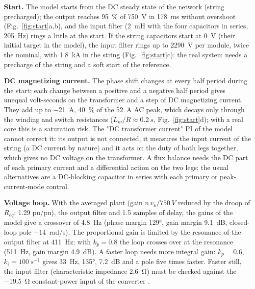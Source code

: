 \documentclass[10pt,a4paper]{scrartcl}
\newcommand{\Req}{R_{eq}}
\begin{document}
\begin{onehalfspace}
\textbf{Start.} The model starts from the DC steady state of the network (string precharged); the output reaches \SI{95}{\percent} of \SI{750}{V} in \SI{178}{ms} without overshoot (Fig.~\ref{fig:start}a,b), and the input filter (\SI{2}{mH} with the four capacitors in series, \SI{205}{Hz}) rings a little at the start. If the string capacitors start at \SI{0}{V} (their initial target in the model), the input filter rings up to \SI{2290}{V} per module, twice the nominal, with \SI{1.8}{kA} in the string (Fig.~\ref{fig:start}c): the real system needs a precharge of the string and a soft start of the reference.

\textbf{DC magnetizing current.} The phase shift changes at every half period during the start; each change between a positive and a negative half period gives unequal volt-seconds on the transformer and a step of DC magnetizing current. They add up to \SI{-21}{A}, \SI{40}{\percent} of the \SI{52}{A} AC peak, which decays only through the winding and switch resistances ($L_m/R \approx \SI{0.2}{s}$, Fig.~\ref{fig:start}d); with a real core this is a saturation risk. The "DC transformer current" PI of the model cannot correct it: its output is not connected, it measures the input current of the string (a DC current by nature) and it acts on the duty of both legs together, which gives no DC voltage on the transformer. A flux balance needs the DC part of each primary current and a differential action on the two legs; the usual alternatives are a DC-blocking capacitor in series with each primary or peak-current-mode control.

\textbf{Voltage loop.} With the averaged plant (gain $n\,v_k/\SI{750}{V}$ reduced by the droop of $\Req$: \num{1.29} pu/pu), the output filter and 1.5 samples of delay, the gains of the model give a crossover of \SI{4.8}{Hz} (phase margin \ang{129}, gain margin \SI{9.1}{dB}, closed-loop pole \SI{-14}{rad/s}). The proportional gain is limited by the resonance of the output filter at \SI{411}{Hz}: with $k_p = 0.8$ the loop crosses over at the resonance (\SI{511}{Hz}, gain margin \SI{4.9}{dB}). A faster loop needs more integral gain: $k_p = 0.6$, $k_i = \SI{100}{s^{-1}}$ gives \SI{33}{Hz}, \ang{135}, \SI{7.2}{dB} and a pole five times faster. Faster still, the input filter (characteristic impedance \SI{2.6}{\ohm}) must be checked against the \SI{-19.5}{\ohm} constant-power input of the converter \cite{middlebrook1976}.



\end{onehalfspace}
\end{document}
